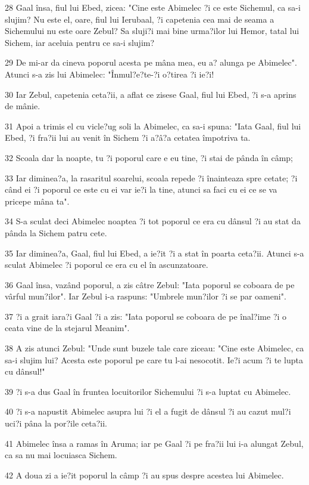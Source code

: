 \par 28 Gaal însa, fiul lui Ebed, zicea: "Cine este Abimelec ?i ce este Sichemul, ca sa-i slujim? Nu este el, oare, fiul lui Ierubaal, ?i capetenia cea mai de seama a Sichemului nu este oare Zebul? Sa sluji?i mai bine urma?ilor lui Hemor, tatal lui Sichem, iar aceluia pentru ce sa-i slujim?
\par 29 De mi-ar da cineva poporul acesta pe mâna mea, eu a? alunga pe Abimelec". Atunci s-a zis lui Abimelec: "Înmul?e?te-?i o?tirea ?i ie?i!
\par 30 Iar Zebul, capetenia ceta?ii, a aflat ce zisese Gaal, fiul lui Ebed, ?i s-a aprins de mânie.
\par 31 Apoi a trimis el cu vicle?ug soli la Abimelec, ca sa-i spuna: "Iata Gaal, fiul lui Ebed, ?i fra?ii lui au venit în Sichem ?i a?â?a cetatea împotriva ta.
\par 32 Scoala dar la noapte, tu ?i poporul care e eu tine, ?i stai de pânda în câmp;
\par 33 Iar diminea?a, la rasaritul soarelui, scoala repede ?i înainteaza spre cetate; ?i când ei ?i poporul ce este cu ei var ie?i la tine, atunci sa faci cu ei ce se va pricepe mâna ta".
\par 34 S-a sculat deci Abimelec noaptea ?i tot poporul ce era cu dânsul ?i au stat da pânda la Sichem patru cete.
\par 35 Iar diminea?a, Gaal, fiul lui Ebed, a ie?it ?i a stat în poarta ceta?ii. Atunci s-a sculat Abimelec ?i poporul ce era cu el în ascunzatoare.
\par 36 Gaal însa, vazând poporul, a zis câtre Zebul: "Iata poporul se coboara de pe vârful mun?ilor". Iar Zebul i-a raspuns: "Umbrele mun?ilor ?i se par oameni".
\par 37 ?i a grait iara?i Gaal ?i a zis: "Iata poporul se coboara de pe înal?ime ?i o ceata vine de la stejarul Meanim".
\par 38 A zis atunci Zebul: "Unde sunt buzele tale care ziceau: "Cine este Abimelec, ca sa-i slujim lui? Acesta este poporul pe care tu l-ai nesocotit. Ie?i acum ?i te lupta cu dânsul!"
\par 39 ?i s-a dus Gaal în fruntea locuitorilor Sichemului ?i s-a luptat cu Abimelec.
\par 40 ?i s-a napustit Abimelec asupra lui ?i el a fugit de dânsul ?i au cazut mul?i uci?i pâna la por?ile ceta?ii.
\par 41 Abimelec însa a ramas în Aruma; iar pe Gaal ?i pe fra?ii lui i-a alungat Zebul, ca sa nu mai locuiasca Sichem.
\par 42 A doua zi a ie?it poporul la câmp ?i au spus despre acestea lui Abimelec.
